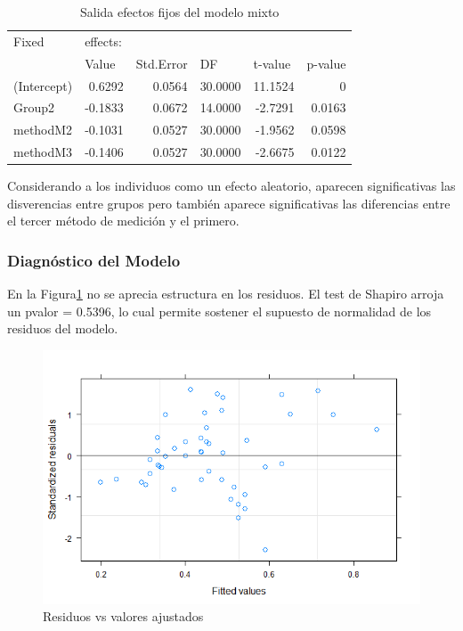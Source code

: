 \documentclass[a4paper,12pt]{article}
\begin{document}
\begin{table}[H]
	\centering
	\caption{Salida efectos fijos del modelo mixto}
	\begin{tabular}{lrrrrr}
		Fixed & \multicolumn{1}{l}{effects:} &       &       &       &  \\
		& \multicolumn{1}{l}{Value} & \multicolumn{1}{l}{Std.Error} & \multicolumn{1}{l}{DF} & \multicolumn{1}{l}{t-value} & \multicolumn{1}{l}{p-value} \\
		(Intercept) & 0.6292 & 0.0564 & 30.0000 & 11.1524 & 0 \\
		Group2 & -0.1833 & 0.0672 & 14.0000 & -2.7291 & 0.0163 \\
		methodM2 & -0.1031 & 0.0527 & 30.0000 & -1.9562 & 0.0598 \\
		methodM3 & -0.1406 & 0.0527 & 30.0000 & -2.6675 & 0.0122 \\
	\end{tabular}%
	\label{anova3}%
\end{table}%

Considerando a los individuos como un efecto aleatorio, aparecen significativas las disverencias entre grupos pero también aparece significativas las diferencias entre el tercer método de medición y el primero.

\subsubsection{Diagnóstico del Modelo}

En la Figura\ref{plot5} no se aprecia estructura en los residuos.
El test de Shapiro arroja un pvalor = 0.5396, lo cual permite sostener el supuesto de normalidad de los residuos del modelo.

\begin{figure}[H]
	\centering
	\caption{Residuos vs valores ajustados}
	\label{plot5}
	\includegraphics[scale=0.8]{plot5.png}
\end{figure}
\end{document}
